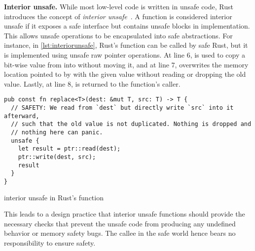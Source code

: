 \textbf{Interior unsafe.}
While most low-level code is written in unsafe code, Rust introduces
the concept of \textit{interior unsafe}~\cite{ruststudy}. A function is considered
interior unsafe if it exposes a safe interface but contains unsafe blocks
in implementation. This allows unsafe operations to be encapsulated
into safe abstractions. For instance, in
\autoref{lst:interiorunsafe}, Rust's  function can be
called by safe Rust, but it is implemented using unsafe raw pointer operations.
At line 6,  is used to copy a bit-wise value from 
into  without moving it, and at line 7,  overwrites
the memory location pointed to by  with the given value 
without reading or dropping the old value. Lastly, at line 8,  is
returned to the function's caller.

\begin{listing}[hbtp]
    \begin{verbatim}
pub const fn replace<T>(dest: &mut T, src: T) -> T {
  // SAFETY: We read from `dest` but directly write `src` into it afterward,
  // such that the old value is not duplicated. Nothing is dropped and
  // nothing here can panic.
  unsafe {
    let result = ptr::read(dest);
    ptr::write(dest, src);
    result
  }
}
    \end{verbatim}
    \caption{interior unsafe in Rust's  function}
    \label{lst:interiorunsafe}
    \vspace{-0.2cm}
\end{listing}

This leads to a design practice that interior unsafe functions should provide
the necessary checks that prevent the unsafe code from producing any undefined
behavior or memory safety bugs.
The callee in the safe world hence bears no responsibility to ensure safety.

